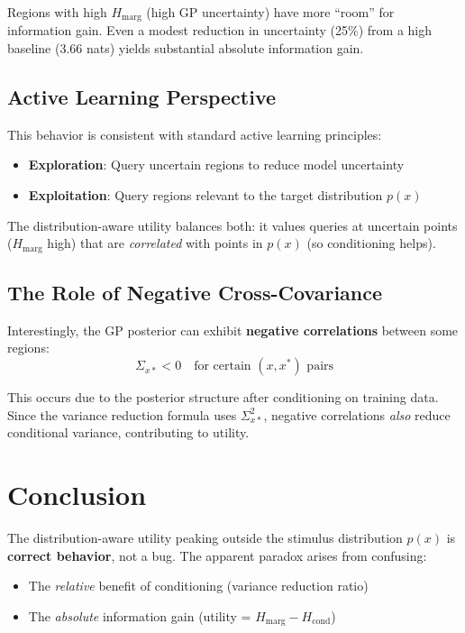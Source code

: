 \documentclass[a4paper,11pt]{article}
\newcommand{\Hmarg}{H_{\mathrm{marg}}}
\newcommand{\Hcond}{H_{\mathrm{cond}}}
\begin{document}
Regions with high $\Hmarg$ (high GP uncertainty) have more ``room'' for information gain. Even a modest reduction in uncertainty (25\%) from a high baseline (3.66 nats) yields substantial absolute information gain.

\subsection{Active Learning Perspective}

This behavior is consistent with standard active learning principles:
\begin{itemize}
    \item \textbf{Exploration}: Query uncertain regions to reduce model uncertainty
    \item \textbf{Exploitation}: Query regions relevant to the target distribution $p(x)$
\end{itemize}

The distribution-aware utility balances both: it values queries at uncertain points ($\Hmarg$ high) that are \emph{correlated} with points in $p(x)$ (so conditioning helps).

\subsection{The Role of Negative Cross-Covariance}

Interestingly, the GP posterior can exhibit \textbf{negative correlations} between some regions:
\begin{equation}
\Sigma_{x*} < 0 \quad \text{for certain } (x, x^*) \text{ pairs}
\end{equation}

This occurs due to the posterior structure after conditioning on training data. Since the variance reduction formula uses $\Sigma_{x*}^2$, negative correlations \emph{also} reduce conditional variance, contributing to utility.

\section{Conclusion}

The distribution-aware utility peaking outside the stimulus distribution $p(x)$ is \textbf{correct behavior}, not a bug. The apparent paradox arises from confusing:
\begin{itemize}
    \item The \emph{relative} benefit of conditioning (variance reduction ratio)
    \item The \emph{absolute} information gain (utility = $\Hmarg - \Hcond$)
\end{itemize}
\end{document}
